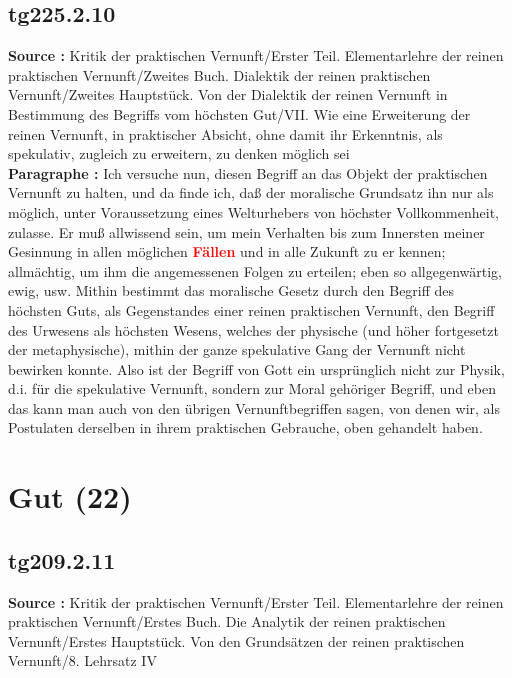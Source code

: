\documentclass[a4paper,12pt,twoside]{book}
\newcommand{\match}[1]{\textcolor{red}{\textbf{#1}}}
\newcommand{\unnumberedsection}[1]{
	\section*{#1}
	\addcontentsline{toc}{section}{#1}
	\markright{#1}
}
\begin{document}
	\subsection*{tg225.2.10} 
	\textbf{Source : }Kritik der praktischen Vernunft/Erster Teil. Elementarlehre der reinen praktischen Vernunft/Zweites Buch. Dialektik der reinen praktischen Vernunft/Zweites Hauptstück. Von der Dialektik der reinen Vernunft in Bestimmung des Begriffs vom höchsten Gut/VII. Wie eine Erweiterung der reinen Vernunft, in praktischer Absicht, ohne damit ihr Erkenntnis, als spekulativ, zugleich zu erweitern, zu denken möglich sei\\  
	
	\textbf{Paragraphe : }Ich versuche nun, diesen Begriff an das Objekt der praktischen Vernunft zu halten, und da finde ich, daß der moralische Grundsatz ihn nur als möglich, unter Voraussetzung eines Welturhebers von höchster Vollkommenheit, zulasse. Er muß allwissend sein, um mein Verhalten bis zum Innersten meiner Gesinnung in allen möglichen \match{Fällen} und in alle Zukunft zu er kennen; allmächtig, um ihm die angemessenen Folgen zu erteilen; eben so allgegenwärtig, ewig, usw. Mithin bestimmt das moralische Gesetz durch den Begriff des höchsten Guts, als Gegenstandes einer reinen praktischen Vernunft, den Begriff des Urwesens als höchsten Wesens, welches der physische (und höher fortgesetzt der metaphysische), mithin der ganze spekulative  Gang der Vernunft nicht bewirken konnte. Also ist der Begriff von Gott ein ursprünglich nicht zur Physik, d.i. für die spekulative Vernunft, sondern zur Moral gehöriger Begriff, und eben das kann man auch von den übrigen Vernunftbegriffen sagen, von denen wir, als Postulaten derselben in ihrem praktischen Gebrauche, oben gehandelt haben. 
	
	\unnumberedsection{Gut (22)} 
	\subsection*{tg209.2.11} 
	\textbf{Source : }Kritik der praktischen Vernunft/Erster Teil. Elementarlehre der reinen praktischen Vernunft/Erstes Buch. Die Analytik der reinen praktischen Vernunft/Erstes Hauptstück. Von den Grundsätzen der reinen praktischen Vernunft/8. Lehrsatz IV\\  
	
\end{document}
